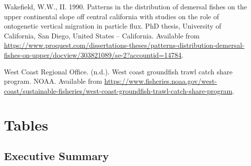 \documentclass[11pt,
  english,
  letterpaper,
]{article}
\newlength{\cslhangindent}
\newenvironment{CSLReferences}[2] %
 {%
  \setlength{\parindent}{0pt}
  \ifodd #1 \everypar{\setlength{\hangindent}{\cslhangindent}}\ignorespaces\fi
  \ifnum #2 > 0
  \setlength{\parskip}{#2\baselineskip}
  \fi
 }%
 {}
\begin{document}
\begin{CSLReferences}{1}{0}
\leavevmode{}%
Wakefield, W.W., II. 1990. Patterns in the distribution of demersal fishes on the upper continental slope off central california with studies on the role of ontogenetic vertical migration in particle flux. PhD thesis, University of California, San Diego, United States -- California. Available from \url{https://www.proquest.com/dissertations-theses/patterns-distribution-demersal-fishes-on-upper/docview/303821089/se-2?accountid=14784}.

\leavevmode{}%
West Coast Regional Office. (n.d.). West coast groundfish trawl catch share program. {NOAA}. Available from \url{https://www.fisheries.noaa.gov/west-coast/sustainable-fisheries/west-coast-groundfish-trawl-catch-share-program}.

\end{CSLReferences}

\clearpage

\hypertarget{tables}{%
\section{Tables}\label{tables}}

\hypertarget{executive-summary-1}{%
\subsection{Executive Summary}\label{executive-summary-1}}

\begingroup\fontsize{10}{12}\selectfont
\begingroup\fontsize{10}{12}\selectfont
\end{document}
